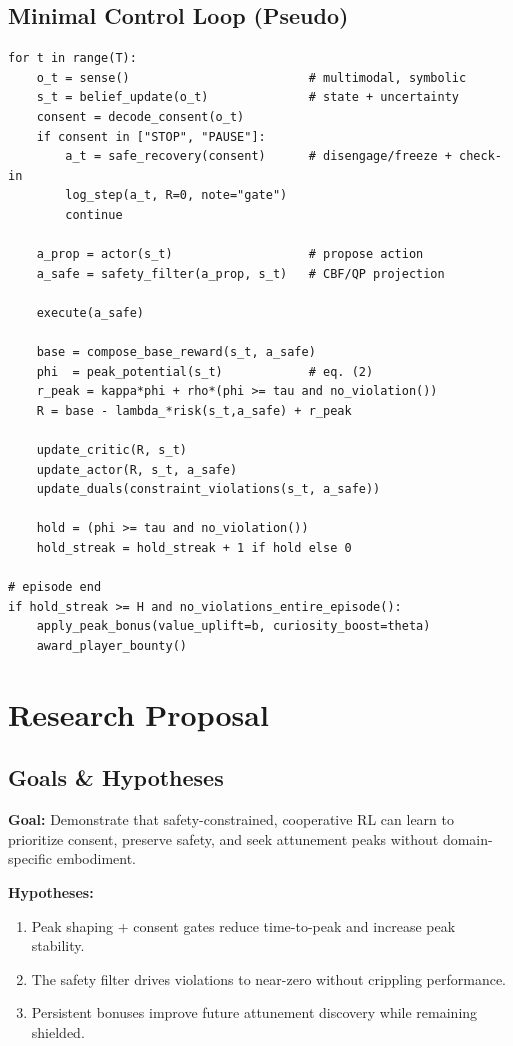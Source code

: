 \documentclass[12pt]{article}
\begin{document}
\subsection{Minimal Control Loop (Pseudo)}
\begin{lstlisting}[style=code]
for t in range(T):
    o_t = sense()                         # multimodal, symbolic
    s_t = belief_update(o_t)              # state + uncertainty
    consent = decode_consent(o_t)
    if consent in ["STOP", "PAUSE"]:
        a_t = safe_recovery(consent)      # disengage/freeze + check-in
        log_step(a_t, R=0, note="gate")
        continue

    a_prop = actor(s_t)                   # propose action
    a_safe = safety_filter(a_prop, s_t)   # CBF/QP projection

    execute(a_safe)

    base = compose_base_reward(s_t, a_safe)
    phi  = peak_potential(s_t)            # eq. (2)
    r_peak = kappa*phi + rho*(phi >= tau and no_violation())
    R = base - lambda_*risk(s_t,a_safe) + r_peak

    update_critic(R, s_t)
    update_actor(R, s_t, a_safe)
    update_duals(constraint_violations(s_t, a_safe))

    hold = (phi >= tau and no_violation())
    hold_streak = hold_streak + 1 if hold else 0

# episode end
if hold_streak >= H and no_violations_entire_episode():
    apply_peak_bonus(value_uplift=b, curiosity_boost=theta)
    award_player_bounty()
\end{lstlisting}

\section{Research Proposal}
\subsection{Goals \& Hypotheses}
\textbf{Goal:} Demonstrate that safety-constrained, cooperative RL can learn to prioritize consent, preserve safety, and seek attunement peaks without domain-specific embodiment.

\noindent\textbf{Hypotheses:}
\begin{enumerate}[leftmargin=*]
  \item Peak shaping + consent gates reduce time-to-peak and increase peak stability.
  \item The safety filter drives violations to near-zero without crippling performance.
  \item Persistent bonuses improve future attunement discovery while remaining shielded.
\end{enumerate}
\end{document}
